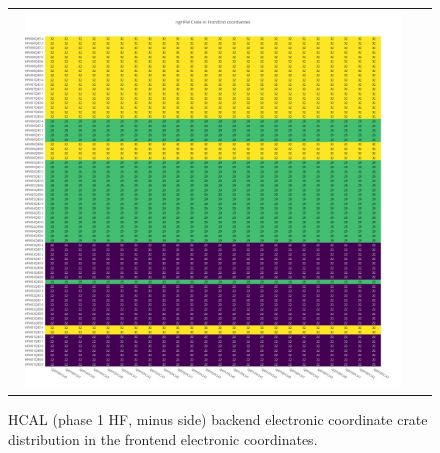 \begin{figure}[htb]
 \begin{center}
  \begin{tabular}{cc}
   \includegraphics[angle=0,width=0.95\textwidth]{figures/appendix/ngHFM_Crate_in_FrontEnd.png}
  \end{tabular}
  \caption{HCAL (phase 1 HF, minus side) backend electronic coordinate crate distribution in the frontend electronic coordinates.}
  \label{fig:lmapngHFMCrateFEC}
 \end{center}
\end{figure}
\clearpage

